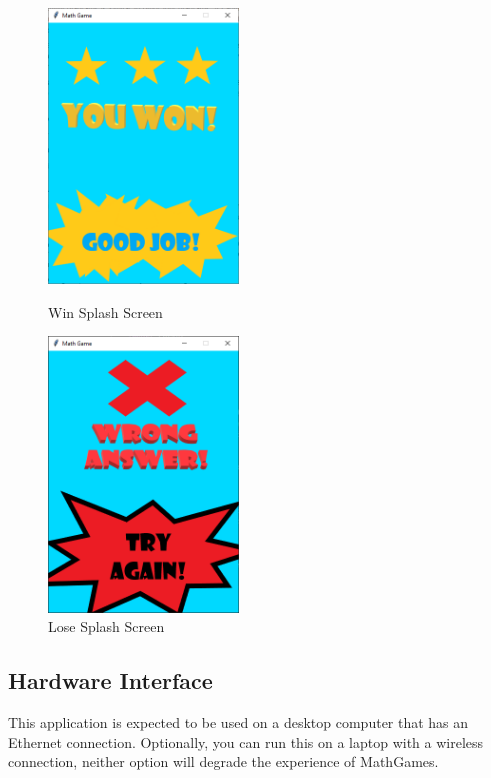 \documentclass[12pt]{article}
\begin{document}
\begin{figure}[htbp]
    \centering
    \includegraphics[width=0.45\textwidth]{Win.PNG}
    \caption{Win Splash Screen}

    \vspace*{\floatsep}

    \includegraphics[width=0.45\textwidth]{Lose.PNG}
    \caption{Lose Splash Screen}
\end{figure}


\subsection{Hardware Interface}

This application is expected to be used on a desktop computer that has an Ethernet connection.
Optionally, you can run this on a laptop with a wireless connection, neither option will degrade the experience of MathGames.
\end{document}

